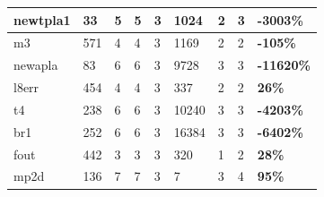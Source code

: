 \documentclass[
]{book}
\begin{document}
\begin{table}
\begin{tabular}{|l|l|l|l|l|l|l|l|l|}
\hline
newtpla1             & 33                                                      & 5                     & 5                   & 3                       & 1024                                                     & 2                     & 3                   & \textbf{-3003\% }      \\ 
\hline
m3                   & 571                                                     & 4                     & 4                   & 3                       & 1169                                                     & 2                     & 2                   & \textbf{-105\% }       \\ 
\hline
newapla              & 83                                                      & 6                     & 6                   & 3                       & 9728                                                     & 3                     & 3                   & \textbf{-11620\% }     \\ 
\hline
l8err                & 454                                                     & 4                     & 4                   & 3                       & 337                                                      & 2                     & 2                   & \textbf{26\% }         \\ 
\hline
t4                   & 238                                                     & 6                     & 6                   & 3                       & 10240                                                    & 3                     & 3                   & \textbf{-4203\% }      \\ 
\hline
br1                  & 252                                                     & 6                     & 6                   & 3                       & 16384                                                    & 3                     & 3                   & \textbf{-6402\% }      \\ 
\hline
fout                 & 442                                                     & 3                     & 3                   & 3                       & 320                                                      & 1                     & 2                   & \textbf{28\% }         \\ 
\hline
mp2d                 & 136                                                     & 7                     & 7                   & 3                       & 7                                                        & 3                     & 4                   & \textbf{95\% }         \\ 

\end{tabular}
\end{table}
\end{document}
